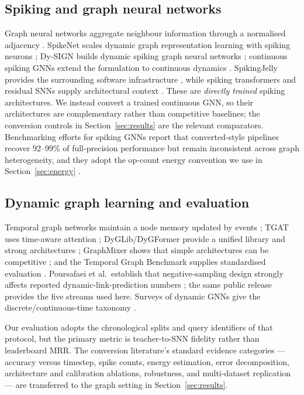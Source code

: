 \documentclass[preprint,12pt]{elsarticle}
\begin{document}
\subsection{Spiking and graph neural networks}

Graph neural networks aggregate neighbour information through a normalised adjacency \cite{kipf2017gcn,hamilton2017graphsage,velickovic2018gat}. SpikeNet scales dynamic graph representation learning with spiking neurons \cite{li2023spikenet}; Dy-SIGN builds dynamic spiking graph neural networks \cite{yin2024dysign}; continuous spiking GNNs extend the formulation to continuous dynamics \cite{li2024continuousgnn}. SpikingJelly provides the surrounding software infrastructure \cite{fang2023spikingjelly}, while spiking transformers and residual SNNs supply architectural context \cite{zhou2023spikformer,che2023autospikformer,yao2023spikedriven,fang2021sew}. These are \emph{directly trained} spiking architectures. We instead convert a trained continuous GNN, so their architectures are complementary rather than competitive baselines; the conversion controls in Section~\ref{sec:results} are the relevant comparators. Benchmarking efforts for spiking GNNs report that converted-style pipelines recover 92--99\% of full-precision performance but remain inconsistent across graph heterogeneity, and they adopt the op-count energy convention we use in Section~\ref{sec:energy} \cite{zhang2025sgnnbench}.

\subsection{Dynamic graph learning and evaluation}

Temporal graph networks maintain a node memory updated by events \cite{rossi2020tgn}; TGAT uses time-aware attention \cite{xu2020tgat}; DyGLib/DyGFormer provide a unified library and strong architectures \cite{yu2023dyglib}; GraphMixer shows that simple architectures can be competitive \cite{cong2023graphmixer}; and the Temporal Graph Benchmark supplies standardised evaluation \cite{huang2023tgb,gao2025hyperevent}. Poursafaei et al.\ establish that negative-sampling design strongly affects reported dynamic-link-prediction numbers \cite{poursafaei2022}; the same public release \cite{poursafaei2022dataset} provides the five streams used here. Surveys of dynamic GNNs give the discrete/continuous-time taxonomy \cite{zheng2025survey}.

Our evaluation adopts the chronological splits and query identifiers of that protocol, but the primary metric is teacher-to-SNN fidelity rather than leaderboard MRR. The conversion literature's standard evidence categories --- accuracy versus timestep, spike counts, energy estimation, error decomposition, architecture and calibration ablations, robustness, and multi-dataset replication \cite{bu2022qcfs,cos2023offset,huang2025dcgs,sengupta2019going} --- are transferred to the graph setting in Section~\ref{sec:results}.
\end{document}
